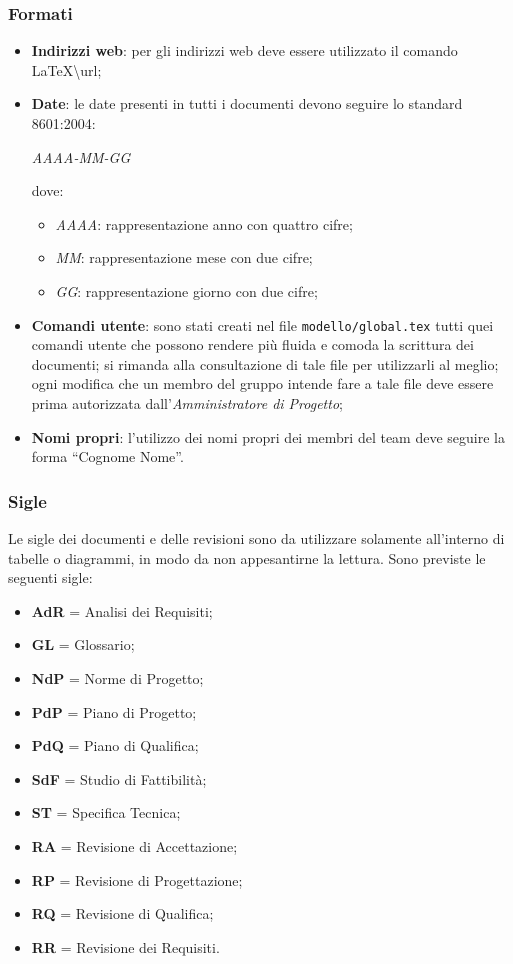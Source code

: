 \subsubsection{Formati}
\begin{itemize}
\item \textbf{Indirizzi web}: per gli indirizzi web deve essere utilizzato il comando \LaTeX \textbackslash{url};
\item \textbf{Date}: le date presenti in tutti i documenti devono seguire lo standard  8601:2004: 
\begin{center}
\textit{AAAA-MM-GG}
\end{center}
dove:
\begin{itemize}
\item \textit{AAAA}: rappresentazione anno con quattro cifre;
\item \textit{MM}: rappresentazione mese con due cifre;
\item \textit{GG}: rappresentazione giorno con due cifre;
\end{itemize}
\item \textbf{Comandi utente}: sono stati creati nel file \texttt{modello/global.tex} tutti quei comandi utente che possono rendere più fluida e comoda la scrittura dei documenti; si rimanda alla consultazione di tale file per utilizzarli al meglio; ogni modifica che un membro del gruppo intende fare a tale file deve essere prima autorizzata dall'\textit{Amministratore di Progetto};
\item \textbf{Nomi propri}: l'utilizzo dei nomi propri dei membri del team deve seguire la
forma “Cognome Nome”.
\end{itemize}

\subsubsection{Sigle}

Le sigle dei documenti e delle revisioni sono da utilizzare solamente all'interno di tabelle o diagrammi, in modo da non appesantirne la lettura. Sono previste le seguenti sigle:

\begin{itemize}
\item \textbf{AdR} = Analisi dei Requisiti;
\item \textbf{GL} = Glossario;
\item \textbf{NdP} = Norme di Progetto;
\item \textbf{PdP} = Piano di Progetto;
\item \textbf{PdQ} = Piano di Qualifica;
\item \textbf{SdF} = Studio di Fattibilità;
\item \textbf{ST} = Specifica Tecnica;
\item \textbf{RA} = Revisione di Accettazione;
\item \textbf{RP} = Revisione di Progettazione;
\item \textbf{RQ} = Revisione di Qualifica;
\item \textbf{RR} = Revisione dei Requisiti.
\end{itemize}

